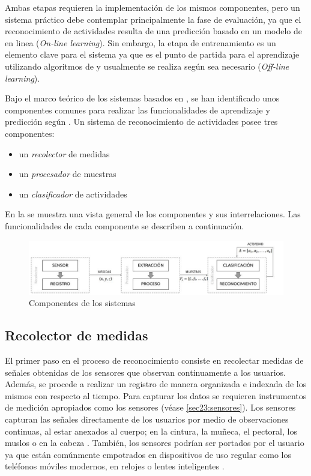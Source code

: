 Ambas etapas requieren la implementación de los mismos componentes,
pero un sistema  práctico debe contemplar principalmente
la fase de evaluación, ya que el reconocimiento de actividades resulta
de una predicción basado en un modelo de  en linea (\emph{On-line
learning}). Sin embargo, la etapa de entrenamiento es un elemento
clave para el sistema ya que es el punto de partida para el aprendizaje
utilizando algoritmos de  y usualmente se realiza según
sea necesario (\emph{Off-line learning}).

Bajo el marco teórico de los sistemas  basados en ,
se han identificado unos componentes comunes para realizar las funcionalidades
de aprendizaje y predicción según \cite{Choudhury2008}. Un sistema
de reconocimiento de actividades posee tres componentes:
\begin{itemize}
\item un \emph{recolector }de medidas
\item un\emph{ procesador }de muestras 
\item un \emph{clasificador }de actividades
\end{itemize}
En la  se muestra una vista general
de los componentes y sus interrelaciones. Las funcionalidades de cada
componente se describen a continuación. 

\begin{figure}[!tbph]
\centering{}\includegraphics[width=1\columnwidth,width=1\linewidth]{capitulo-4/graphics/diagrama_4_1}\caption[Componentes ]{\label{fig4:componentes-har}Componentes de los sistemas }
\end{figure}


\subsection{Recolector de medidas}

\label{sec43:recolector-datos}El primer paso en el proceso de reconocimiento
consiste en recolectar medidas de señales obtenidas de los sensores
que observan continuamente a los usuarios. Además, se procede a realizar
un registro de manera organizada e indexada de los mismos con respecto
al tiempo. Para capturar los datos se requieren instrumentos de medición
apropiados como los sensores (véase \ref{sec23:sensores}). Los sensores
capturan las señales directamente de los usuarios por medio de observaciones
continuas, al estar anexados al cuerpo; en la cintura, la muñeca,
el pectoral, los muslos o en la cabeza \cite{Bao2004}. También, los
sensores podrían ser portados por el usuario ya que están comúnmente
empotrados en dispositivos de uso regular como los teléfonos móviles
modernos, en relojes o lentes inteligentes \cite{LaraLabrador2012,Choudhury2008}.

